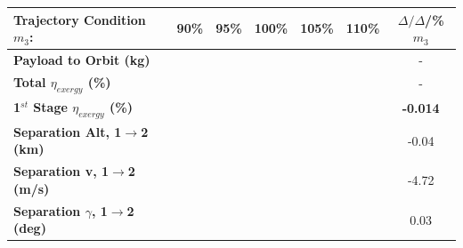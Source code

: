 \begin{table}[ht] %
	\centering
	
	\begin{tabular}{l c c c c c c} 
		\hline \textbf{Trajectory Condition}   \qquad  $m_{3}$:
		&90\%
		&95\%
		&100\%
		&105\%
		&110\%
		& $\Delta/\Delta$/\%$m_{3}$
		\\
		\hline \textbf{Payload to Orbit (kg)}
		& \textbf{\PayloadToOrbitmThreeNinetyNoReturn}
		& \textbf{\PayloadToOrbitmThreeNinetyFiveNoReturn}
		& \textbf{\PayloadToOrbitmThreeStandardNoReturn}
		& \textbf{\PayloadToOrbitmThreeOneHundredFiveNoReturn}
		& \textbf{\PayloadToOrbitmThreeOneHundredTenNoReturn}
		& -
		\\
		\textbf{Total $\eta_{exergy}$ (\%)}
		& \textbf{\totalExergyEffmThreeNinetyNoReturn}
		& \textbf{\totalExergyEffmThreeNinetyFiveNoReturn}
		& \textbf{\totalExergyEffmThreeStandardNoReturn}
		& \textbf{\totalExergyEffmThreeOneHundredFiveNoReturn}
		& \textbf{\totalExergyEffmThreeOneHundredTenNoReturn}
		& -
		\\
		\hline 
		\textbf{1$^{st}$ Stage $\eta_{exergy}$ (\%)}
		& \textbf{\firstExergyEffmThreeNinetyNoReturn}
		& \textbf{\firstExergyEffmThreeNinetyFiveNoReturn}
		& \textbf{\firstExergyEffmThreeStandardNoReturn}
		& \textbf{\firstExergyEffmThreeOneHundredFiveNoReturn}
		& \textbf{\firstExergyEffmThreeOneHundredTenNoReturn}
		& \textbf{-0.014}
		\\
		\textbf{Separation Alt, 1$\rightarrow$2 (km)}
		& \firstsecondSeparationAltmThreeNinetyNoReturn
		& \firstsecondSeparationAltmThreeNinetyFiveNoReturn
		& \firstsecondSeparationAltmThreeStandardNoReturn
		& \firstsecondSeparationAltmThreeOneHundredFiveNoReturn
		& \firstsecondSeparationAltmThreeOneHundredTenNoReturn
		&-0.04
		\\
		\textbf{Separation v, 1$\rightarrow$2 (m/s)}
		& \firstsecondSeparationvmThreeNinetyNoReturn
		& \firstsecondSeparationvmThreeNinetyFiveNoReturn
		& \firstsecondSeparationvmThreeStandardNoReturn
		& \firstsecondSeparationvmThreeOneHundredFiveNoReturn
		& \firstsecondSeparationvmThreeOneHundredTenNoReturn
		&-4.72
		\\
		\textbf{Separation $\gamma$, 1$\rightarrow$2 (deg)}
		& \firstsecondSeparationgammamThreeNinetyNoReturn
		& \firstsecondSeparationgammamThreeNinetyFiveNoReturn
		& \firstsecondSeparationgammamThreeStandardNoReturn
		& \firstsecondSeparationgammamThreeOneHundredFiveNoReturn
		& \firstsecondSeparationgammamThreeOneHundredTenNoReturn
		&0.03
		\\

\end{tabular}
\end{table}
